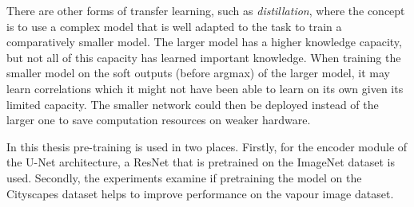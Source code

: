 There are other forms of transfer learning, such as \emph{distillation}, where the concept is to use a complex model that is well adapted to the task to train a comparatively smaller model. The larger model has a higher knowledge capacity, but not all of this capacity has learned important knowledge. When training the smaller model on the soft outputs (before argmax) of the larger model, it may learn correlations which it might not have been able to learn on its own given its limited capacity. The smaller network could then be deployed instead of the larger one to save computation resources on weaker hardware.

In this thesis pre-training is used in two places. Firstly, for the encoder module of the U-Net architecture, a ResNet that is pretrained on the ImageNet dataset is used. Secondly, the experiments examine if pretraining the model on the Cityscapes dataset helps to improve performance on the vapour image dataset.